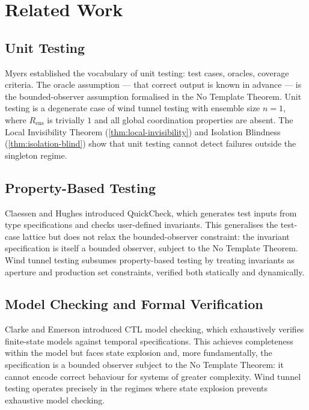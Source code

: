 \documentclass[twocolumn,a4paper,11pt]{article}
\theoremstyle{plain}
\theoremstyle{definition}
\theoremstyle{remark}
\begin{document}
\section{Related Work}
\label{sec:related}

\subsection{Unit Testing}

Myers \cite{myers1979} established the vocabulary of unit testing: test
cases, oracles, coverage criteria. The oracle assumption --- that correct
output is known in advance --- is the bounded-observer assumption
formalised in the No Template Theorem. Unit testing is a degenerate case
of wind tunnel testing with ensemble size $n = 1$, where $R_\mathrm{ens}$
is trivially $1$ and all global coordination properties are absent. The
Local Invisibility Theorem (\cref{thm:local-invisibility}) and Isolation
Blindness (\cref{thm:isolation-blind}) show that unit testing cannot
detect failures outside the singleton regime.

\subsection{Property-Based Testing}

Claessen and Hughes \cite{claessen2000} introduced QuickCheck, which
generates test inputs from type specifications and checks user-defined
invariants. This generalises the test-case lattice but does not relax the
bounded-observer constraint: the invariant specification is itself a
bounded observer, subject to the No Template Theorem. Wind tunnel testing
subsumes property-based testing by treating invariants as aperture and
production set constraints, verified both statically and dynamically.

\subsection{Model Checking and Formal Verification}

Clarke and Emerson \cite{clarke1981} introduced CTL model checking, which
exhaustively verifies finite-state models against temporal specifications.
This achieves completeness within the model but faces state explosion and,
more fundamentally, the specification is a bounded observer subject to the
No Template Theorem: it cannot encode correct behaviour for systems of
greater complexity. Wind tunnel testing operates precisely in the regimes
where state explosion prevents exhaustive model checking.
\end{document}
